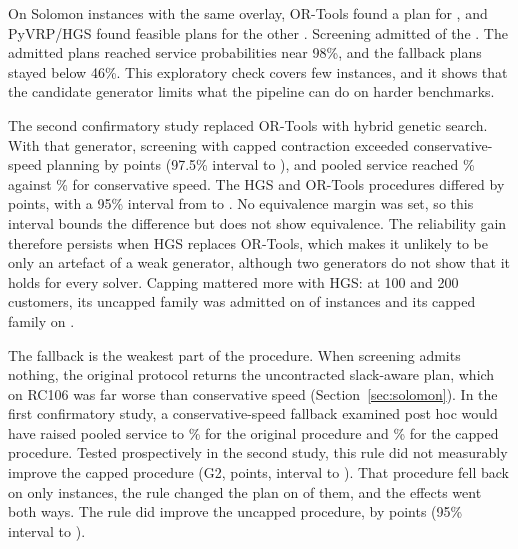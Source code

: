 \documentclass[11pt,a4paper]{article}
\begin{document}
On \SolomonN{} Solomon instances with the same overlay, OR-Tools found a plan for
\SolomonPlans{}, and PyVRP/HGS found feasible plans for the other
\SolomonNoPlan{}. Screening admitted \SolomonAdmitted{} of the \SolomonPlans{}.
The admitted plans reached service probabilities near 98\%, and the fallback
plans stayed below 46\%. This exploratory check covers few instances, and it
shows that the candidate generator limits what the pipeline can do on harder
benchmarks.

The second confirmatory study replaced OR-Tools with hybrid genetic search. With
that generator, screening with capped contraction exceeded conservative-speed
planning by \CtwoGOneMean{} points (97.5\% interval \CtwoGOneLo{} to
\CtwoGOneHi{}), and pooled service reached \CtwoPooledHGSK\% against
\CtwoPooledHGSCons\% for conservative speed. The HGS and OR-Tools procedures
differed by \CtwoGFourMean{} points, with a 95\% interval from \CtwoGFourLo{} to
\CtwoGFourHi{}. No equivalence margin was set, so this interval bounds the
difference but does not show equivalence. The reliability gain therefore
persists when HGS replaces OR-Tools, which makes it unlikely to be only an
artefact of a weak generator, although two generators do not show that it
holds for every solver. Capping mattered more with HGS: at 100 and 200
customers, its uncapped family was admitted on \CtwoHGSPAdmittedLarge{} of
\CtwoLarge{} instances and its capped family on \CtwoHGSKAdmittedLarge{}.

The fallback is the weakest part of the procedure. When screening admits nothing,
the original protocol returns the uncontracted slack-aware plan, which on RC106
was far worse than conservative speed (Section~\ref{sec:solomon}). In the first
confirmatory study, a conservative-speed fallback examined post hoc would have
raised pooled service to \PostHocP\% for the original procedure and \PostHocK\%
for the capped procedure. Tested prospectively in the second study, this rule did
not measurably improve the capped procedure (G2, \CtwoGTwoMean{} points, interval
\CtwoGTwoLo{} to \CtwoGTwoHi{}). That procedure fell back on only
\CtwoORTKFallbacks{} instances, the rule changed the plan on
\CtwoFallbacksChanged{} of them, and the effects went both ways. The rule did
improve the uncapped procedure, by \CtwoGThreeMean{} points (95\% interval
\CtwoGThreeLo{} to \CtwoGThreeHi{}).
\end{document}
